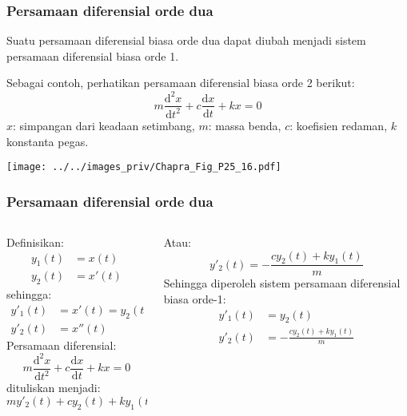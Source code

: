 \begin{frame}
\frametitle{Persamaan diferensial orde dua}

Suatu persamaan diferensial biasa orde dua dapat diubah menjadi sistem persamaan
diferensial biasa orde 1.

Sebagai contoh, perhatikan persamaan diferensial biasa orde 2 berikut:
\begin{equation*}
m \frac{\mathrm{d}^2 x}{\mathrm{d}t^2} + c \frac{\mathrm{d}x}{\mathrm{d}t} + kx = 0
\end{equation*}
$x$: simpangan dari keadaan setimbang, $m$: massa benda, $c$: koefisien redaman, $k$ konstanta pegas.

{\centering
\texttt{[image: ../../images\_priv/Chapra\_Fig\_P25\_16.pdf]}
\par}

\end{frame}




\begin{frame}
\frametitle{Persamaan diferensial orde dua}

\begin{columns}

\begin{column}{0.5\textwidth}
Definisikan:
\begin{align*}
y_{1}(t) & = x(t) \\
y_{2}(t) & = x'(t)
\end{align*}
%
sehingga:
%
\begin{align*}
y'_{1}(t) & = x'(t) = y_{2}(t) \\
y'_{2}(t) & = x''(t)
\end{align*}
Persamaan diferensial:
\begin{equation*}
m \frac{\mathrm{d}^2 x}{\mathrm{d}t^2} + c \frac{\mathrm{d}x}{\mathrm{d}t} + kx = 0
\end{equation*}
dituliskan menjadi:
\begin{equation*}
m y'_{2}(t) + c y_{2}(t) + k y_{1}(t) = 0
\end{equation*}

\end{column}


\begin{column}{0.5\textwidth}
Atau:
\begin{equation*}
y'_{2}(t) = -\frac{c y_{2}(t) + k y_{1}(t)}{m}
\end{equation*}
Sehingga diperoleh sistem persamaan diferensial biasa orde-1:
\begin{align*}
y'_{1}(t) & = y_{2}(t) \\
y'_{2}(t) & = -\frac{c y_{2}(t) + k y_{1}(t)}{m}
\end{align*}
\end{column}

\end{columns}

\end{frame}



